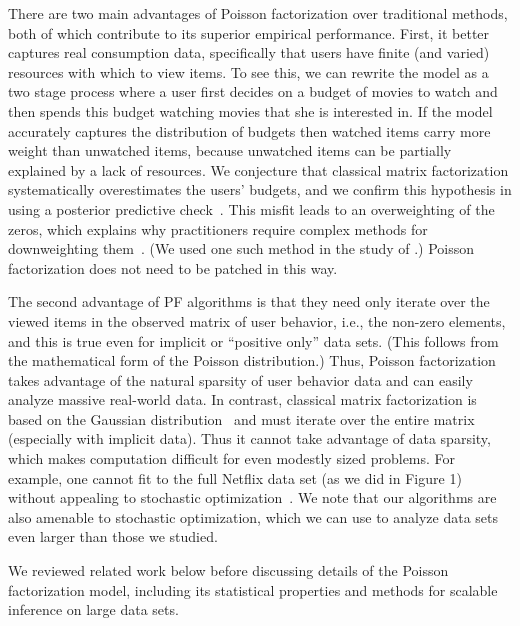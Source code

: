 
There are two main advantages of Poisson factorization over
traditional methods, both of which contribute to its superior
empirical performance.  First, it better captures real consumption
data, specifically that users have finite (and varied) resources with
which to view items.  To see this, we can rewrite the model as a two
stage process where a user first decides on a budget of movies to
watch and then spends this budget watching movies that she is
interested in.  If the model accurately captures the distribution of
budgets then watched items carry more weight than unwatched items,
because unwatched items can be partially explained by a lack of
resources. We conjecture that classical matrix factorization
systematically overestimates the users' budgets, and we confirm this
hypothesis in  using a posterior predictive
check~\cite{Gelman:1996}.  This misfit leads to an overweighting of
the zeros, which explains why practitioners require complex methods
for downweighting
them~\cite{Hu:2008p9402,Gantner:2012p9364,Dror:2012a,Paquet:2013p9197}.
(We used one such method in the study of .)  Poisson
factorization does not need to be patched in this way.

The second advantage of PF algorithms is that they need only iterate
over the viewed items in the observed matrix of user behavior, i.e.,
the non-zero elements, and this is true even for implicit or
``positive only'' data sets.  (This follows from the mathematical form
of the Poisson distribution.)  Thus, Poisson factorization takes
advantage of the natural sparsity of user behavior data and can easily
analyze massive real-world data. In contrast, classical matrix
factorization is based on the Gaussian
distribution~\cite{Salakhutdinov:2008} and must iterate over the
entire matrix (especially with implicit data).  Thus it cannot take
advantage of data sparsity, which makes computation difficult for even
modestly sized problems.  For example, one cannot fit to the full
Netflix data set (as we did in Figure 1) without appealing to
stochastic optimization~\cite{Mairal:2010}.  We note that our
algorithms are also amenable to stochastic optimization, which we can
use to analyze data sets even larger than those we studied.


We reviewed related work below before discussing details of the
Poisson factorization model, including its statistical properties and
methods for scalable inference on large data sets.


